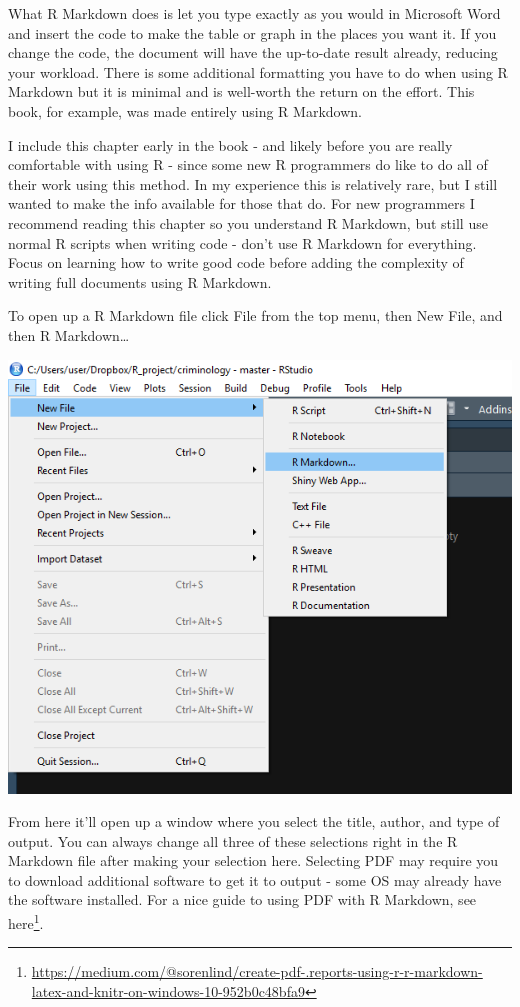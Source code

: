 \documentclass[
]{krantz}
\renewcommand{\href}[2]{#2\footnote{\url{#1}}}
\begin{document}
What R Markdown does is let you type exactly as you would in Microsoft Word and insert the code to make the table or graph in the places you want it. If you change the code, the document will have the up-to-date result already, reducing your workload. There is some additional formatting you have to do when using R Markdown but it is minimal and is well-worth the return on the effort. This book, for example, was made entirely using R Markdown.

I include this chapter early in the book - and likely before you are really comfortable with using R - since some new R programmers do like to do all of their work using this method. In my experience this is relatively rare, but I still wanted to make the info available for those that do. For new programmers I recommend reading this chapter so you understand R Markdown, but still use normal R scripts when writing code - don't use R Markdown for everything. Focus on learning how to write good code before adding the complexity of writing full documents using R Markdown.

To open up a R Markdown file click File from the top menu, then New File, and then R Markdown\ldots{}

\includegraphics{images/markdown1.png}

From here it'll open up a window where you select the title, author, and type of output. You can always change all three of these selections right in the R Markdown file after making your selection here. Selecting PDF may require you to download additional software to get it to output - some OS may already have the software installed. For a nice guide to using PDF with R Markdown, see \href{https://medium.com/@sorenlind/create-pdf-.reports-using-r-r-markdown-latex-and-knitr-on-windows-10-952b0c48bfa9}{here}.
\end{document}
